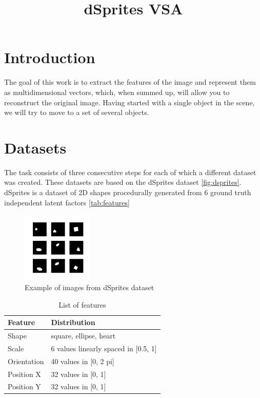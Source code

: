 \documentclass{article}
\title{dSprites VSA}
\author{ }
\date{ }
\begin{document}
    \maketitle


    \section{Introduction}

    The goal of this work is to extract the features of the image
    and represent them as multidimensional vectors, which, when
    summed up, will allow you to reconstruct the original image.
    Having started with a single object in the scene, we will try
    to move to a set of several objects.


    \section{Datasets}
    The task consists of three consecutive steps for each of
    which a different dataset was created. These datasets are based on
    the dSprites dataset \autoref{fig:dsprites}.
    dSprites is a dataset of 2D shapes procedurally generated
    from 6 ground truth independent latent factors \autoref{tab:features}


    \begin{figure}[ht]
        \centering
        \includegraphics[width=0.3\textwidth]{img/datasets/dsprites}
        \caption{Example of images from dSprites dataset}
        \label{fig:dsprites}
    \end{figure}

    \begin{table}[ht]
        \centering
        \caption{List of features}
        \label{tab:features}
        \begin{tabular}[t]{ll}
            \hline
            Feature     & Distribution                         \\
            \hline
            Shape       & square, ellipse, heart               \\
            Scale       & 6 values linearly spaced in [0.5, 1] \\
            Orientation & 40 values in [0, 2 pi]               \\
            Position X  & 32 values in [0, 1]                  \\
            Position Y  & 32 values in [0, 1]                  \\
            \hline
        \end{tabular}
    \end{table}
\end{document}
